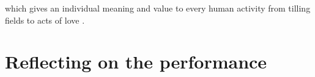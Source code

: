 which gives an individual meaning and value to every human activity from tilling fields to acts of love \cite{marx_economic_1844, mitchell_i_2013}.










\section{Reflecting on the performance}

